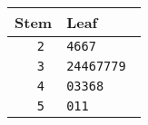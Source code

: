 \begin{tabular}{r|l}
  Stem  & Leaf \\
  \hline
  \tt 2 & \tt 4667 \\
  \tt 3 & \tt 24467779 \\
  \tt 4 & \tt 03368 \\
  \tt 5 & \tt 011 \\
\end{tabular}
